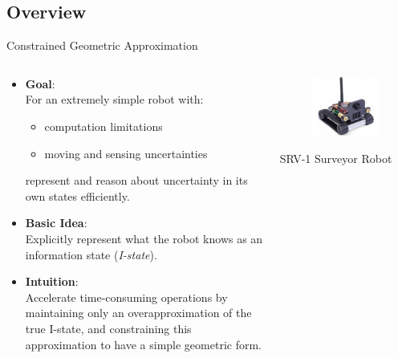 \documentclass[10pt]{beamer}
\begin{document}
\subsection[Problem]{Overview}
\begin{frame}{Constrained Geometric Approximation}
\begin{columns}
  \begin{column}{.65\textwidth}
    \begin{itemize}
    \item \textbf{Goal}:\\
    For an extremely simple robot with:
    \begin{itemize}
    \item computation limitations
    \item moving and sensing uncertainties
    \end{itemize}
    represent and reason about uncertainty in its own states efficiently.\\
    \item \textbf{Basic Idea}:\\
    Explicitly represent what the robot knows as an information state (\textit{I-state}).
    \item \textbf{Intuition}:\\
    Accelerate time-consuming operations by maintaining only an \textcolor[rgb]{1.00,0.00,0.00}{overapproximation} of the true
    I-state, and constraining this approximation
    to have a simple geometric form.\\
    \end{itemize}
  \end{column}
  \begin{column}{.35\textwidth}
    \begin{figure}
    \includegraphics[scale=0.2]{figs/srvq.jpg}
    \end{figure}
    SRV-1 Surveyor Robot
  \end{column}
\end{columns}
\end{frame}
\end{document}
